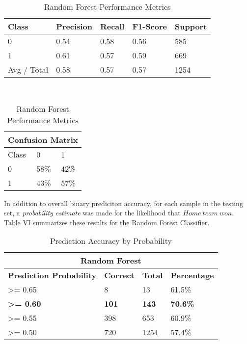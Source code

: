 \documentclass[letterpaper, 10 pt, conference]{ieeeconf}
\begin{document}
\begin{table}[]
\centering
\caption{Random Forest Performance Metrics}
\begin{tabular}{@{}lllll@{}}
\toprule
\textbf{Class} & \textbf{Precision} & \textbf{Recall} & \textbf{F1-Score} & \textbf{Support} \\ \midrule
0              & 0.54               & 0.58            & 0.56              & 585              \\
1              & 0.61               & 0.57            & 0.59              & 669              \\ \midrule
Avg / Total    & 0.58               & 0.57            & 0.57              & 1254             \\ \bottomrule
\end{tabular}\\\medskip
\centering
\begin{tabular}{@{}lll@{}}
\toprule
\multicolumn{3}{l}{\textbf{Confusion Matrix}} \\ \midrule
Class             & 0               & 1              \\
0            & 58\%            & 42\%           \\
1            & 43\%            & 57\%           \\ \bottomrule
\end{tabular}
\end{table}

In addition to overall binary prediciton accuracy, for each sample in the testing set, a \textit{probability estimate} was made for the likelihood that $Home\ team\ won$. Table VI summarizes these results for the Random Forest Classifier.


\begin{table}[h]
\caption{Prediction Accuracy by Probability}
\centering
\begin{tabular}{@{}llll@{}}

\multicolumn{4}{c}{\textbf{Random Forest}}                                                \\\toprule
\textbf{Prediction Probability} & \textbf{Correct} & \textbf{Total} & \textbf{Percentage} \\ \midrule
\textgreater= 0.65              & 8                & 13             & 61.5\%             \\
\textbf{\textgreater= 0.60}     & \textbf{101}     & \textbf{143}   & \textbf{70.6\%}    \\
\textgreater= 0.55              & 398              & 653            & 60.9\%             \\
\textgreater= 0.50              & 720              & 1254           & 57.4\%             \\ \bottomrule
\end{tabular}
\end{table}
\end{document}
